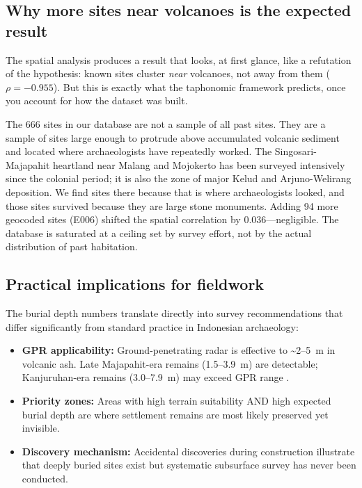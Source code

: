 \documentclass[12pt,a4paper]{article}
\begin{document}
\subsection{Why more sites near volcanoes is the expected result}

The spatial analysis produces a result that looks, at first glance, like a refutation of the hypothesis: known sites cluster \textit{near} volcanoes, not away from them ($\rho = -0.955$). But this is exactly what the taphonomic framework predicts, once you account for how the dataset was built.

The 666 sites in our database are not a sample of all past sites. They are a sample of sites large enough to protrude above accumulated volcanic sediment and located where archaeologists have repeatedly worked. The Singosari-Majapahit heartland near Malang and Mojokerto has been surveyed intensively since the colonial period; it is also the zone of major Kelud and Arjuno-Welirang deposition. We find sites there because that is where archaeologists looked, and those sites survived because they are large stone monuments. Adding 94 more geocoded sites (E006) shifted the spatial correlation by 0.036---negligible. The database is saturated at a ceiling set by survey effort, not by the actual distribution of past habitation.

\subsection{Practical implications for fieldwork}

The burial depth numbers translate directly into survey recommendations that differ significantly from standard practice in Indonesian archaeology:

\begin{itemize}
  \item \textbf{GPR applicability:} Ground-penetrating radar is effective to \textasciitilde2--5~m in volcanic ash. Late Majapahit-era remains (1.5--3.9~m) are detectable; Kanjuruhan-era remains (3.0--7.9~m) may exceed GPR range \citep{conyers2004}.
  \item \textbf{Priority zones:} Areas with high terrain suitability AND high expected burial depth are where settlement remains are most likely preserved yet invisible.
  \item \textbf{Discovery mechanism:} Accidental discoveries during construction illustrate that deeply buried sites exist but systematic subsurface survey has never been conducted.
\end{itemize}
\end{document}
